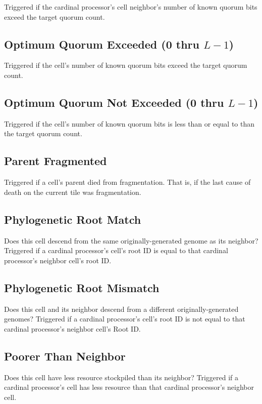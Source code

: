 Triggered if the cardinal processor's cell neighbor's number of known quorum bits exceed the target quorum count.

\subsection{Optimum Quorum Exceeded (0 thru $L-1$)}

Triggered if the cell's number of known quorum bits exceed the target quorum count.

\subsection{Optimum Quorum Not Exceeded (0 thru $L-1$)}

Triggered if the cell's number of known quorum bits is less than or equal to than the target quorum count.

\subsection{Parent Fragmented}

Triggered if a cell's parent died from fragmentation.
That is, if the last cause of death on the current tile was fragmentation.

\subsection{Phylogenetic Root Match}

Does this cell descend from the same originally-generated genome as its neighbor?
Triggered if a cardinal processor's cell's root ID is equal to that cardinal processor's neighbor cell's root ID.

\subsection{Phylogenetic Root Mismatch}

Does this cell and its neighbor descend from a different originally-generated genomes?
Triggered if a cardinal processor's cell's root ID is not equal to that cardinal processor's neighbor cell's Root ID.

\subsection{Poorer Than Neighbor}

Does this cell have less resource stockpiled than its neighbor?
Triggered if a cardinal processor's cell has less resource than that cardinal processor's neighbor cell.

